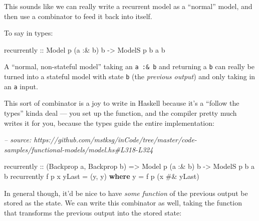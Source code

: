 \documentclass[]{article}
\newenvironment{Shaded}{}{}
\newcommand{\CommentTok}[1]{\textcolor[rgb]{0.38,0.63,0.69}{\textit{#1}}}
\newcommand{\DataTypeTok}[1]{\textcolor[rgb]{0.56,0.13,0.00}{#1}}
\newcommand{\FunctionTok}[1]{\textcolor[rgb]{0.02,0.16,0.49}{#1}}
\newcommand{\KeywordTok}[1]{\textcolor[rgb]{0.00,0.44,0.13}{\textbf{#1}}}
\newcommand{\NormalTok}[1]{#1}
\newcommand{\OtherTok}[1]{\textcolor[rgb]{0.00,0.44,0.13}{#1}}
\begin{document}
This sounds like we can really write a recurrent model as a ``normal'' model,
and then use a combinator to feed it back into itself.

To say in types:

\begin{Shaded}
\begin{Highlighting}[]
\NormalTok{recurrently}
\OtherTok{    ::} \DataTypeTok{Model}\NormalTok{  p   (a }\FunctionTok{:&}\NormalTok{ b) b}
    \OtherTok{->} \DataTypeTok{ModelS}\NormalTok{ p b  a       b}
\end{Highlighting}
\end{Shaded}

A ``normal, non-stateful model'' taking an \texttt{a\ :\&\ b} and returning a
\texttt{b} can really be turned into a stateful model with state \texttt{b} (the
\emph{previous output}) and only taking in an \texttt{a} input.

This sort of combinator is a joy to write in Haskell because it's a ``follow the
types'' kinda deal --- you set up the function, and the compiler pretty much
writes it for you, because the types guide the entire implementation:

\begin{Shaded}
\begin{Highlighting}[]
\CommentTok{-- source: https://github.com/mstksg/inCode/tree/master/code-samples/functional-models/model.hs#L318-L324}

\NormalTok{recurrently}
\OtherTok{    ::}\NormalTok{ (}\DataTypeTok{Backprop}\NormalTok{ a, }\DataTypeTok{Backprop}\NormalTok{ b)}
    \OtherTok{=>} \DataTypeTok{Model}\NormalTok{  p   (a }\FunctionTok{:&}\NormalTok{ b) b}
    \OtherTok{->} \DataTypeTok{ModelS}\NormalTok{ p b  a       b}
\NormalTok{recurrently f p x yLast }\FunctionTok{=}\NormalTok{ (y, y)}
  \KeywordTok{where}
\NormalTok{    y }\FunctionTok{=}\NormalTok{ f p (x }\FunctionTok{#&}\NormalTok{ yLast)}
\end{Highlighting}
\end{Shaded}

In general though, it'd be nice to have \emph{some function} of the previous
output be stored as the state. We can write this combinator as well, taking the
function that transforms the previous output into the stored state:
\end{document}

